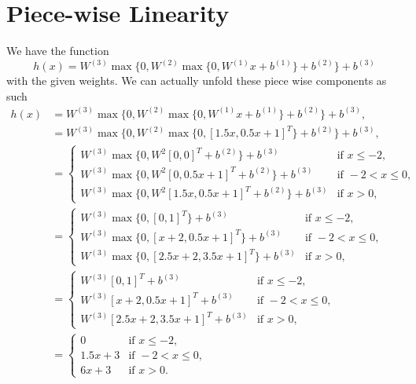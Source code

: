 \documentclass[twoside]{article}
\begin{document}
\section{Piece-wise Linearity}
We have the function
\begin{equation*}
	h(x) = W^{(3)}\max \{0, W^{(2)} \max \{0, W^{(1)}x + b^{(1)}\} + b^{(2)}\} + b^{(3)}
\end{equation*}
with the given weights. We can actually unfold these piece wise components as such
\begin{align*}
	h(x)
	 & = W^{(3)}\max \{0, W^{(2)} \max \{0, W^{(1)}x + b^{(1)}\} + b^{(2)}\} + b^{(3)},           \\
	 & =  W^{(3)}\max \{0, W^{(2)} \max \{0, [1.5x, 0.5x + 1]^{T}\} + b^{(2)}\} + b^{(3)},        \\
	 & =
	\begin{cases}
		W^{(3)} \max \{0, W^{2}[0, 0]^{T} + b^{(2)}\} + b^{(3)}           & \text{if } x \leq -2,     \\
		W^{(3)} \max \{0, W^{2}[0, 0.5x + 1]^{T} + b^{(2)}\} + b^{(3)}    & \text{if } -2 < x \leq 0, \\
		W^{(3)} \max \{0, W^{2}[1.5x, 0.5x + 1]^{T} + b^{(2)}\} + b^{(3)} & \text{if } x > 0,
	\end{cases} \\
	 & =
	\begin{cases}
		W^{(3)} \max \{0, [0, 1]^{T}\} + b^{(3)}               & \text{if } x \leq -2,     \\
		W^{(3)} \max \{0, [x + 2, 0.5x + 1]^{T}\} + b^{(3)}    & \text{if } -2 < x \leq 0, \\
		W^{(3)} \max \{0, [2.5x + 2, 3.5x + 1]^{T}\} + b^{(3)} & \text{if } x > 0,
	\end{cases}            \\
	 & =
	\begin{cases}
		W^{(3)}[0, 1]^{T} + b^{(3)}                & \text{if } x \leq -2,     \\
		W^{(3)} [x + 2, 0.5x + 1]^{T} + b^{(3)}    & \text{if } -2 < x \leq 0, \\
		W^{(3)} [2.5x + 2, 3.5x + 1]^{T} + b^{(3)} & \text{if } x > 0,
	\end{cases}                        \\
	 & =
	\begin{cases}
		0        & \text{if } x \leq -2,     \\
		1.5x + 3 & \text{if } -2 < x \leq 0, \\
		6x + 3   & \text{if } x > 0.
	\end{cases}
\end{align*}
\end{document}
